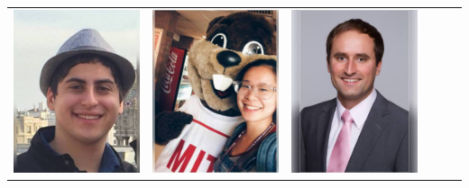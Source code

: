 \documentclass[landscape,a0paper,fontscale=0.292]{baposter}
\begin{document}
\begin{poster}
{\begin{center}
\begin{tabularx}{\linewidth}{X X X X X X}
{\centering \includegraphics[width=0.6\linewidth]{nbuckman.jpg}}&
{\centering \includegraphics[width=0.6\linewidth]{qlai.jpg}}&
{\centering \includegraphics[width=0.6\linewidth]{rkk.jpg}}&

\end{tabularx}
\end{center}}
\end{poster}
\end{document}
